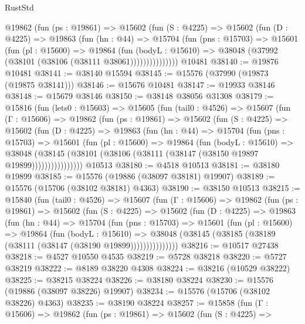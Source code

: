 \begin{lexlean}{RustStd}
\begin{coremodule}
          @19862
            (fun (ps : @19861) =>
            @15602
              (fun (S : @4225) =>
              @15602
                (fun (D : @4225) =>
                @19863
                  (fun (hn : @44) =>
                  @15704
                    (fun (pns : @15703) =>
                    @15601
                      (fun (pl : @15600) =>
                      @19864
                        (fun (bodyL : @15610) =>
                        @38048 (@37992 (@38101 (@38106 (@38111 @38061)))))))))))))))
    @10481
@38140 := @19876 @10481
@38141 := @38140 @15594
@38145 := @15576 (@37990 (@19873 (@19875 @38141)))
@38146 := @15676 @10481
@38147 := @19933 @38146
@38148 := @15679 @38146
@38150 := @38148 @38056 @31308
@38179 := @15816
    (fun (lets0 : @15603) =>
    @15605
      (fun (tail0 : @4526) =>
      @15607
        (fun (Γ : @15606) =>
        @19862
          (fun (ps : @19861) =>
          @15602
            (fun (S : @4225) =>
            @15602
              (fun (D : @4225) =>
              @19863
                (fun (hn : @44) =>
                @15704
                  (fun (pns : @15703) =>
                  @15601
                    (fun (pl : @15600) =>
                    @19864
                      (fun (bodyL : @15610) =>
                      @38048
                        (@38145
                          (@38101 (@38106 (@38111 (@38147 (@38150 @19897 @19899))))))))))))))))
    @10513
@38180 := @4518 @10513
@38181 := @38180 @19899
@38185 := @15576 (@19886 (@38097 @38181) @19907)
@38189 := @15576 (@15706 (@38102 @38181) @4363)
@38190 := @38150 @10513
@38215 := @15840
    (fun (tail0 : @4526) =>
    @15607
      (fun (Γ : @15606) =>
      @19862
        (fun (ps : @19861) =>
        @15602
          (fun (S : @4225) =>
          @15602
            (fun (D : @4225) =>
            @19863
              (fun (hn : @44) =>
              @15704
                (fun (pns : @15703) =>
                @15601
                  (fun (pl : @15600) =>
                  @19864
                    (fun (bodyL : @15610) =>
                    @38048 (@38145 (@38185 (@38189 (@38111 (@38147 (@38190 @19899)))))))))))))))
@38216 := @10517 @27438
@38218 := @4527 @10550 @4535
@38219 := @5728 @38218
@38220 := @5727 @38219
@38222 := @8189 @38220 @4308
@38224 := @38216 (@10529 @38222)
@38225 := @38215 @38224
@38226 := @38180 @38224
@38230 := @15576 (@19886 (@38097 @38226) @19907)
@38234 := @15576 (@15706 (@38102 @38226) @4363)
@38235 := @38190 @38224
@38257 := @15858
    (fun (Γ : @15606) =>
    @19862
      (fun (ps : @19861) =>
      @15602
        (fun (S : @4225) =>

\end{coremodule}
\end{lexlean}
